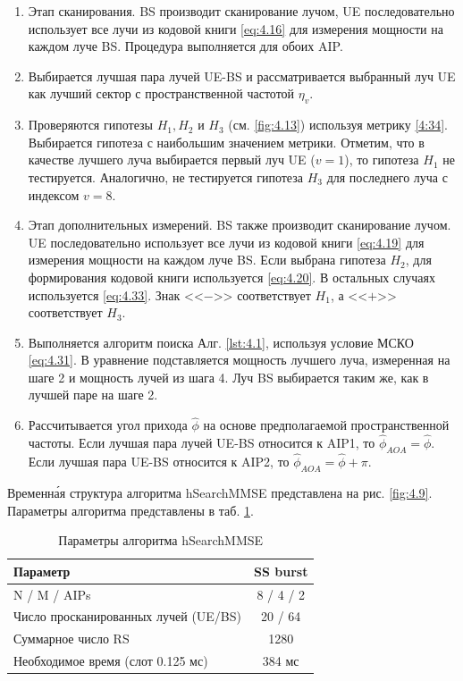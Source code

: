 \begin{enumerate}[label=\textbf{Шаг \arabic*:}]
    \item Этап сканирования. BS производит сканирование лучом, UE
          последовательно использует все лучи из кодовой книги \eqref{eq:4.16} для
          измерения мощности на каждом луче BS. Процедура выполняется для обоих AIP.
    \item \label{enum:hSearchMMSE:2} Выбирается лучшая пара лучей UE-BS и рассматривается выбранный луч UE как лучший сектор
          с пространственной частотой $\eta_v$.
    \item Проверяются гипотезы $H_1, H_2$ и $H_3$ (см. \ref{fig:4.13}) используя метрику \eqref{4:34}.
          Выбирается гипотеза с наибольшим значением метрики. Отметим, что в качестве лучшего луча выбирается первый луч UE ($v=1$), то гипотеза $H_1$ не тестируется.
          Аналогично, не тестируется гипотеза $H_3$ для последнего луча с индексом $v=8$.
    \item \label{enum:hSearchMMSE:4} Этап дополнительных измерений. BS также производит сканирование лучом.
          UE последовательно использует все лучи из кодовой книги \eqref{eq:4.19} для
          измерения мощности на каждом луче BS. Если выбрана гипотеза $H_2$, для формирования кодовой книги используется \eqref{eq:4.20}.
          В остальных случаях используется \eqref{eq:4.33}. Знак <<$-$>> соответствует $H_1$, а <<$+$>> соответствует  $H_3$.
    \item Выполняется алгоритм поиска Алг. \ref{lst:4.1}, используя условие МСКО \eqref{eq:4.31}. В уравнение подставляется мощность лучшего луча, измеренная
          на шаге 2 и мощность лучей из шага 4. Луч BS выбирается таким же, как в лучшей паре на шаге 2.
    \item Рассчитывается угол прихода $\hat \phi$ на основе предполагаемой пространственной частоты. Если лучшая пара лучей UE-BS
          относится к AIP1, то $\hat \phi_{AOA} = \hat \phi$. Если лучшая пара UE-BS относится к AIP2, то $\hat \phi_{AOA} = \hat \phi + \pi$.
\end{enumerate}


Временн\'{а}я структура алгоритма hSearchMMSE представлена на рис. \ref{fig:4.9}. Параметры алгоритма представлены в таб. \ref{tab:4.3}.
\begin{table}
    \centering
    \caption{Параметры алгоритма hSearchMMSE}
    \label{tab:4.3}
    \begin{tabular}{|l|c|}
        \hline
        Параметр                             & SS burst  \\
        \hline
        N / M / AIPs                         & 8 / 4 / 2 \\
        Число просканированных лучей (UE/BS) & 20 / 64   \\
        Суммарное число RS                   & 1280      \\
        Необходимое время (слот 0.125 мс)    & 384 мс    \\
        \hline
    \end{tabular}
\end{table}

